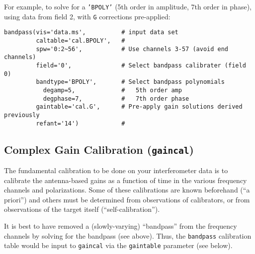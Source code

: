 {For example, to solve for a {\tt 'BPOLY'} (5th order in amplitude, 7th order
in phase), using data from field 2, with {\tt G} corrections pre-applied:
\small
\begin{verbatim}
bandpass(vis='data.ms',          # input data set
         caltable='cal.BPOLY',   #
         spw='0:2~56',           # Use channels 3-57 (avoid end channels)
         field='0',              # Select bandpass calibrater (field 0)
         bandtype='BPOLY',       # Select bandpass polynomials
           degamp=5,             #   5th order amp
           degphase=7,           #   7th order phase
         gaintable='cal.G',      # Pre-apply gain solutions derived previously
         refant='14')            #   
\end{verbatim}
\normalsize

\subsection{Complex Gain Calibration ({\tt gaincal})}
\label{section:cal.solve.gain}

The fundamental calibration to be done on your interferometer data
is to calibrate the antenna-based gains as a function of time in
the various frequency channels and polarizations.  Some of
these calibrations are known beforehand (``a priori'') and others
must be determined from observations of calibrators, or from observations
of the target itself (``self-calibration'').

It is best to have removed a (slowly-varying) ``bandpass'' from the
frequency channels by solving for the bandpass (see above).  Thus,
the {\tt bandpass} calibration table would be input to {\tt gaincal} via
the {\tt gaintable} parameter (see below).

}
